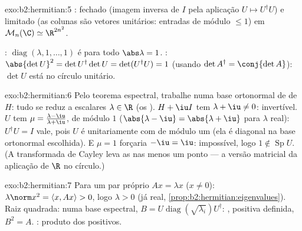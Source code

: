 \begin{solution}{exo:b2:hermitian:5}
: fechado (imagem inversa de $I$ pela aplicação  $U \mapsto
U^\dagger U$) e limitado (as colunas são vetores unitários: entradas de
módulo $\leq 1$) em $\mathcal{M}_n(\C) \simeq \R^{2n^2}$.

: $\operatorname{diag}(\lambda, 1, \dots, 1)$ é 
para todo $\abs\lambda = 1$. : $\abs{\det U}^2 = \det
U^\dagger \det U = \det(U^\dagger U) = 1$ (usando $\det A^\dagger =
\conj{\det A}$): $\det U$ está no círculo unitário.
\end{solution}

\begin{solution}{exo:b2:hermitian:6}
Pelo teorema espectral, trabalhe numa base ortonormal de  de $H$:
tudo se reduz a escalares $\lambda \in \R$ (os ).
$H + \iu I$ tem  $\lambda + \iu \neq 0$: invertível. $U$
tem  $\mu = \frac{\lambda - \iu}{\lambda + \iu}$, de
módulo $1$ ($\abs{\lambda - \iu} = \abs{\lambda + \iu}$ para $\lambda$
real): $U^\dagger U = I$ vale, pois $U$ é unitariamente
 com  de módulo um (ela é diagonal na
base ortonormal escolhida). E $\mu = 1$ forçaria $-\iu = \iu$:
impossível, logo $1 \notin \operatorname{Sp} U$. (A transformada de
Cayley leva as  nas  menos um ponto --- a versão
matricial da aplicação de $\R$ no círculo.)
\end{solution}

\begin{solution}{exo:b2:hermitian:7}
Para um par próprio $Ax = \lambda x$ ($x \neq 0$): $\lambda\norm x^2 =
\langle x, Ax\rangle > 0$, logo $\lambda > 0$ (já real,
\cref{prop:b2:hermitian:eigenvalues}). Raiz quadrada: numa base
espectral, $B = U\operatorname{diag}(\sqrt{\lambda_i})U^\dagger$:
, positiva definida, $B^2 = A$. : produto dos
 positivos.
\end{solution}

